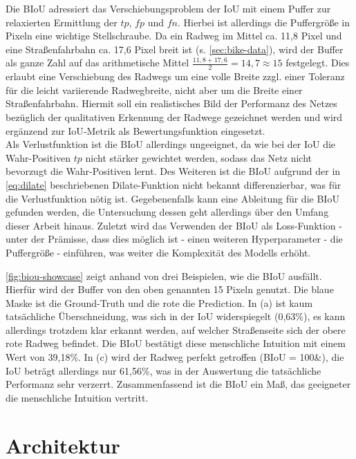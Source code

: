 Die \ac{BIoU} adressiert das Verschiebungsproblem der \ac{IoU} mit einem Puffer zur relaxierten Ermittlung der 
$tp$, $fp$ und $fn$. Hierbei ist allerdings die Puffergröße in Pixeln eine wichtige Stellschraube.  
Da ein Radweg im Mittel ca. 11,8 Pixel und eine Straßenfahrbahn ca. 17,6 Pixel breit ist (s. \autoref{sec:bike-data}), 
wird der Buffer als ganze Zahl auf das arithmetische Mittel $\frac{11,8 + 17,6}{2} = 14,7 \approx 15$ festgelegt. 
Dies erlaubt eine Verschiebung des Radwegs um eine volle Breite zzgl. einer Toleranz für die leicht variierende Radwegbreite, 
nicht aber um die Breite einer Straßenfahrbahn. Hiermit soll ein realistisches Bild der Performanz des Netzes 
bezüglich der qualitativen Erkennung der Radwege gezeichnet werden und wird ergänzend zur \ac{IoU}-Metrik 
als Bewertungsfunktion eingesetzt. \\
Als Verlustfunktion ist die \ac{BIoU} allerdings ungeeignet, da wie bei der \ac{IoU} die Wahr-Positiven $tp$ nicht 
stärker gewichtet werden, sodass das Netz nicht bevorzugt die Wahr-Positiven lernt. Des Weiteren ist die \ac{BIoU} aufgrund der 
in \autoref{eq:dilate} beschriebenen Dilate-Funktion nicht bekannt differenzierbar, was für die Verlustfunktion nötig ist. 
Gegebenenfalls kann eine Ableitung für die \ac{BIoU} gefunden werden, 
die Untersuchung dessen geht allerdings über den Umfang dieser Arbeit hinaus. 
Zuletzt wird das Verwenden der \ac{BIoU} als Loss-Funktion - unter der Prämisse, dass dies möglich ist - einen weiteren 
Hyperparameter - die Puffergröße - einführen, was weiter die Komplexität des Modells erhöht.  

\autoref{fig:biou-showcase} zeigt anhand von drei Beispielen, wie die BIoU ausfällt. Hierfür wird 
der Buffer von den oben genannten 15 Pixeln genutzt. 
Die blaue Maske ist die Ground-Truth und die rote die Prediction. In (a) ist kaum 
tatsächliche Überschneidung, was sich in der IoU widerspiegelt (0,63\%), es kann allerdings trotzdem 
klar erkannt werden, auf welcher Straßenseite sich der obere rote Radweg befindet. Die BIoU 
bestätigt diese menschliche Intuition mit einem Wert von 39,18\%. In (c) wird der Radweg perfekt getroffen
(BIoU = 100\&), die IoU beträgt allerdings nur 61,56\%, was in der Auswertung die tatsächliche Performanz 
sehr verzerrt. Zusammenfassend ist die BIoU ein Maß, das geeigneter die menschliche Intuition vertritt.

\section{Architektur} \label{sec:architecture}

